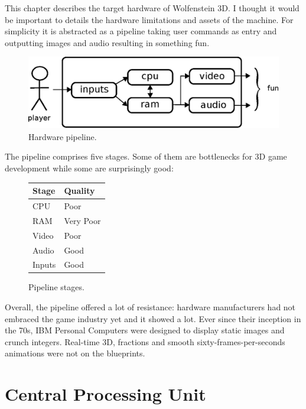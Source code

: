 \documentclass[book.tex]{subfiles}
\begin{document}
This chapter describes the target hardware of Wolfenstein 3D. I thought it would be important to details the hardware limitations and assets of the machine. For simplicity it is abstracted as a pipeline taking user commands as entry and outputting images and audio resulting in something fun.\\
 \bigskip
\begin{figure}[H]
\centering
\includegraphics[scale=1.2]{imgs/fun_pipeline.eps}
%
\caption{Hardware pipeline.}
\label{fig:digraph}
\end{figure}

The pipeline comprises five stages. Some of them are bottlenecks for 3D game development while some are surprisingly good:

 \bigskip

\begin{figure}[H]
\centering
\begin{tabularx}{\textwidth}{ X X  }
  \toprule
  \textbf{Stage} & \textbf{Quality} \\ \bottomrule
  CPU & Poor \\ 
  RAM & Very Poor \\ 
  Video & Poor \\ 
  Audio & Good \\ 
  Inputs & Good \\ \bottomrule
\end{tabularx}
\caption{Pipeline stages.}  \label{fig:Pipeline stages}
\end{figure}

Overall, the pipeline offered a lot of resistance: hardware manufacturers had not embraced the game industry yet and it showed a lot. Ever since their inception in the 70s, IBM Personal Computers were designed to display static images and crunch integers. Real-time 3D, fractions and smooth sixty-frames-per-seconds animations were not on the blueprints.

\section{Central Processing Unit}
\end{document}

